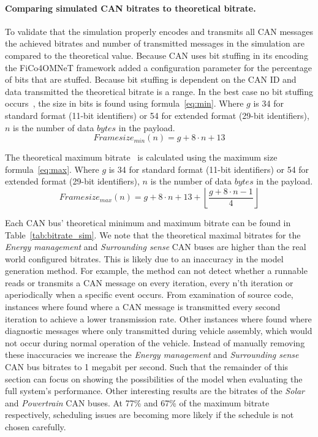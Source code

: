 \paragraph{Comparing simulated CAN bitrates to theoretical bitrate.}

To validate that the simulation properly encodes and transmits all CAN messages the achieved bitrates and number of transmitted messages in the simulation are compared to the theoretical value. Because CAN uses bit stuffing in its encoding the FiCo4OMNeT framework added a configuration parameter for the percentage of bits that are stuffed. Because bit stuffing is dependent on the CAN ID and data transmitted the theoretical bitrate is a range. In the best case no bit stuffing occurs~\cite{davis2007controller}, the size in bits is found using formula~\ref{eq:min}. Where $g$ is 34 for standard format (11-bit identifiers) or 54 for extended format (29-bit identifiers), $n$ is the number of data $bytes$ in the payload.
\begin{equation}
    \label{eq:min}
    Framesize_{min}(n) = g+8\cdot n + 13
\end{equation}

The theoretical maximum bitrate~\cite{davis2007controller} is calculated using the maximum size formula~\ref{eq:max}. Where $g$ is 34 for standard format (11-bit identifiers) or 54 for extended format (29-bit identifiers), $n$ is the number of data $bytes$ in the payload.
\begin{equation}
    \label{eq:max}
Framesize_{max}(n) = g +8\cdot n +13 +\left\lfloor\frac{g+8\cdot n-1}{4}\right\rfloor
\end{equation}

Each CAN bus' theoretical minimum and maximum bitrate can be found in Table~\ref{tab:bitrate_sim}. We note that the theoretical maximal bitrates for the \textit{Energy management} and \textit{Surrounding sense} CAN buses are higher than the real world configured bitrates. This is likely due to an inaccuracy in the model generation method. For example, the method can not detect whether a runnable reads or transmits a CAN message on every iteration, every n'th iteration or aperiodically when a specific event occurs. From examination of source code, instances where found where a CAN message is transmitted every second iteration to achieve a lower transmission rate. Other instances where found where diagnostic messages where only transmitted during vehicle assembly, which would not occur during normal operation of the vehicle. Instead of manually removing these inaccuracies we increase the \textit{Energy management} and \textit{Surrounding sense} CAN bus bitrates to 1 megabit per second. Such that the remainder of this section can focus on showing the possibilities of the model when evaluating the full system's performance. Other interesting results are the bitrates of the \textit{Solar} and \textit{Powertrain} CAN buses. At 77\% and 67\% of the maximum bitrate respectively, scheduling issues are becoming more likely if the schedule is not chosen carefully.

